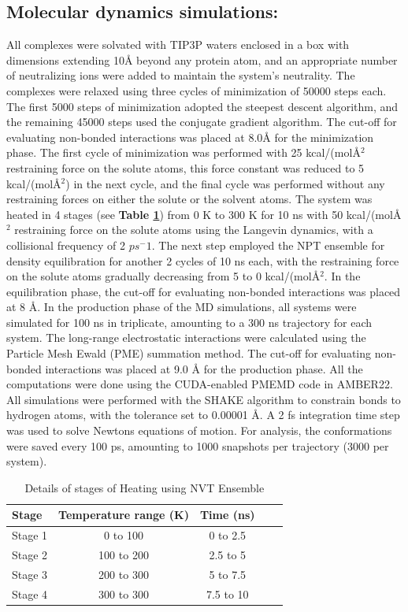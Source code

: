 \documentclass[12pt, a4paper]{achemso}
\begin{document}
\subsection{Molecular dynamics simulations:} 
 All complexes were solvated with TIP3P\cite{tip3p} waters enclosed in a box with dimensions extending 10\r{A} beyond any protein atom,  and an appropriate number of neutralizing ions were added to maintain the system's neutrality.  The complexes were relaxed using three cycles of minimization of 50000 steps each.  The first 5000 steps of minimization adopted the steepest descent algorithm, and the remaining 45000 steps used the conjugate gradient algorithm.  The cut-off for evaluating non-bonded interactions was placed at 8.0\r{A} for the minimization phase.  The first cycle of minimization was performed with  25 kcal/(mol{\r{A}$^2$} restraining force on the solute atoms, this force constant was reduced to 5 kcal/(mol\r{A}$^2$)  in the next cycle, and the final cycle was performed without any restraining forces on either the solute or the solvent atoms.  The system was heated in 4 stages (see \textbf{Table \ref{tbl: Heating using NVT Ensemble}}) from 0 K to 300 K for 10 ns with  50 kcal/(mol{\r{A}$^2$} restraining force on the solute atoms using the Langevin dynamics, with a collisional frequency of  2 $ps^-1$.  The next step employed the NPT ensemble for density equilibration for another 2 cycles of 10 ns each, with the restraining force on the solute atoms gradually decreasing from 5 to 0 kcal/(mol{\r{A}$^2$}.  In the equilibration phase, the cut-off for evaluating non-bonded interactions was placed at 8 {\r{A}}.  In the production phase of the MD simulations, all systems were simulated for 100 ns in triplicate, amounting to a 300 ns trajectory for each system.  The long-range electrostatic interactions were calculated using the Particle Mesh Ewald (PME) summation method\cite{pme}. The cut-off for evaluating non-bonded interactions was placed at 9.0 {\r{A}}  for the production phase. All the computations were done using the CUDA-enabled PMEMD code\cite{pmemd01, pmemd02, pmemd03} in AMBER22\cite{amber22, amber}.  
All simulations were performed with the SHAKE algorithm\cite{shake} to constrain bonds to hydrogen atoms, with the tolerance set to 0.00001 {\AA}.  A 2 fs integration time step was used to solve Newton\textquotesingle s equations of motion.  For analysis, the conformations were saved every 100 ps, amounting to 1000 snapshots per trajectory (3000 per system). 

\begin{table}
  \caption{Details of stages of Heating using NVT Ensemble}
  \label{tbl: Heating using NVT Ensemble}
  \begin{tabular}{lcccc}
    \hline
   \textbf{Stage}  & \textbf{Temperature range (K)} & \textbf{Time (ns)} \\
    \hline
    Stage 1 & 0 to 100 & 0 to 2.5 \\
    Stage 2 & 100 to 200 & 2.5 to 5 \\
    Stage 3 & 200 to 300 & 5 to 7.5 \\
    Stage 4 & 300 to 300 & 7.5 to 10 \\ 
    \hline
  \end{tabular}
\end{table}
\end{document}
